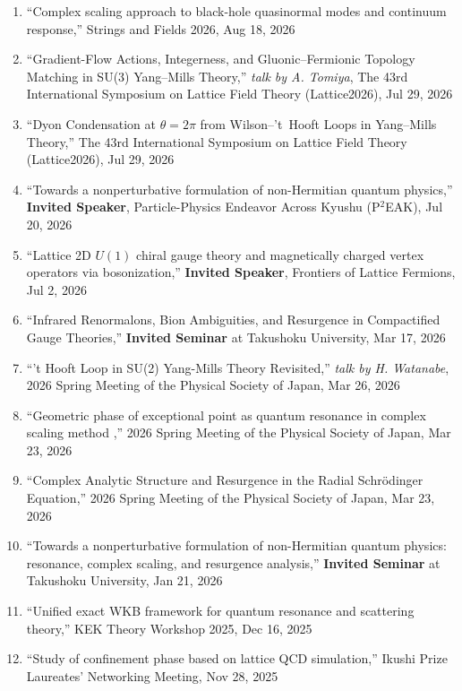 \begin{enumerate}
       2026 Annual (81st) Meeting of the Physical Society of Japan, Sep 14, 2026
 \item ``Complex scaling approach to black-hole quasinormal modes and continuum response,''
       Strings and Fields 2026, Aug 18, 2026
 \item ``Gradient-Flow Actions, Integerness, and Gluonic--Fermionic Topology Matching in SU(3) Yang--Mills Theory,''
       \textit{talk by A. Tomiya},
       The 43rd International Symposium on Lattice Field Theory (Lattice2026), Jul 29, 2026
 \item ``Dyon Condensation at $\theta=2\pi$ from Wilson--'t~Hooft Loops in Yang--Mills Theory,''
       The 43rd International Symposium on Lattice Field Theory (Lattice2026), Jul 29, 2026
 \item ``Towards a nonperturbative formulation of non-Hermitian quantum physics,''
       \textbf{Invited Speaker},
       Particle-Physics Endeavor Across Kyushu (P$^2$EAK), Jul 20, 2026
 \item ``Lattice 2D $U(1)$ chiral gauge theory and magnetically charged vertex operators via bosonization,''
       \textbf{Invited Speaker},
       Frontiers of Lattice Fermions, Jul 2, 2026
 \item ``Infrared Renormalons, Bion Ambiguities, and Resurgence in Compactified Gauge Theories,''
       \textbf{Invited Seminar} at Takushoku University, Mar 17, 2026
 \item ``'t Hooft Loop in SU(2) Yang-Mills Theory Revisited,''
       \textit{talk by H. Watanabe},
       2026 Spring Meeting of the Physical Society of Japan, Mar 26, 2026
 \item ``Geometric phase of exceptional point as quantum resonance in complex scaling method
,''
       2026 Spring Meeting of the Physical Society of Japan, Mar 23, 2026
 \item ``Complex Analytic Structure and Resurgence in the Radial Schr\"odinger Equation,''
       2026 Spring Meeting of the Physical Society of Japan, Mar 23, 2026
 \item ``Towards a nonperturbative formulation of non-Hermitian quantum physics: resonance, complex scaling, and resurgence analysis,''
       \textbf{Invited Seminar} at Takushoku University, Jan 21, 2026
 \item ``Unified exact WKB framework for quantum resonance and scattering theory,''
       KEK Theory Workshop 2025, Dec 16, 2025
 \item ``Study of confinement phase based on lattice QCD simulation,''
       Ikushi Prize Laureates’ Networking Meeting, Nov 28, 2025

\end{enumerate}
